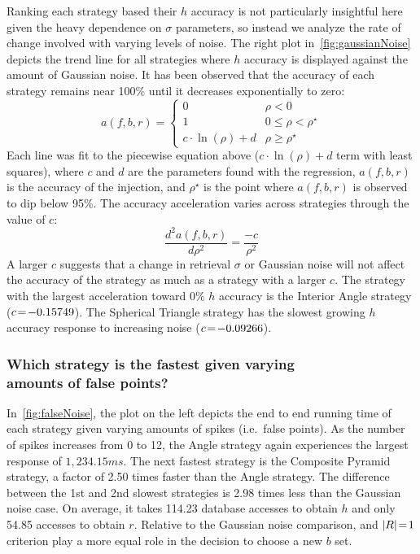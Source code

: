Ranking each strategy based their $h$ accuracy is not particularly insightful here given the heavy dependence on
$\sigma$ parameters, so instead we analyze the rate of change involved with varying levels of noise.
The right plot in~\autoref{fig:gaussianNoise} depicts the trend line for all strategies where $h$ accuracy is displayed
against the amount of Gaussian noise.
It has been observed that the accuracy of each strategy remains near 100\% until it decreases exponentially to zero:
\begin{equation}
    a(f, b, r) =
    \begin{cases}
        0 & \rho < 0 \\
        1 & 0 \leq \rho < \rho^{\star} \\
        c \cdot \ln(\rho) + d & \rho \geq \rho^{\star}
    \end{cases}
\end{equation}
Each line was fit to the piecewise equation above ($c\cdot \ln(\rho) + d$ term with least squares), where $c$ and $d$
are the parameters found with the regression, $a(f, b, r)$ is the accuracy of the injection, and $\rho^{\star}$ is the
point where $a(f, b, r)$ is observed to dip below 95\%.
The accuracy acceleration varies across strategies through the value of $c$:
\begin{equation}
    \frac{d^{2}a(f, b, r)}{d\rho^2} = \frac{-c}{\rho^2}
\end{equation}
A larger $c$ suggests that a change in retrieval $\sigma$ or Gaussian noise will not affect the accuracy of the strategy
as much as a strategy with a larger $c$.
The strategy with the largest acceleration toward $0\%$ $h$ accuracy is the Interior Angle strategy ($c \!=\! -0.15749$).
The Spherical Triangle strategy has the slowest growing $h$ accuracy response to increasing noise ($c \!=\! -0.09266$).

\subsubsection{Which strategy is the fastest given varying \\ amounts of false points?}
In~\autoref{fig:falseNoise}, the plot on the left depicts the end to end running time of each strategy given varying
amounts of spikes (i.e.\ false points).
As the number of spikes increases from 0 to 12, the Angle strategy again experiences the largest response of
$1{,}234.15\si{ms}$.
The next fastest strategy is the Composite Pyramid strategy, a factor of 2.50 times faster than the Angle strategy.
The difference between the 1st and 2nd slowest strategies is 2.98 times less than the Gaussian noise case.
On average, it takes 114.23 database accesses to obtain $h$ and only 54.85 accesses to obtain $r$.
Relative to the Gaussian noise comparison,  and $\left| R \right| \!=\! 1$ criterion play a more equal role in
the decision to choose a new $b$ set.

